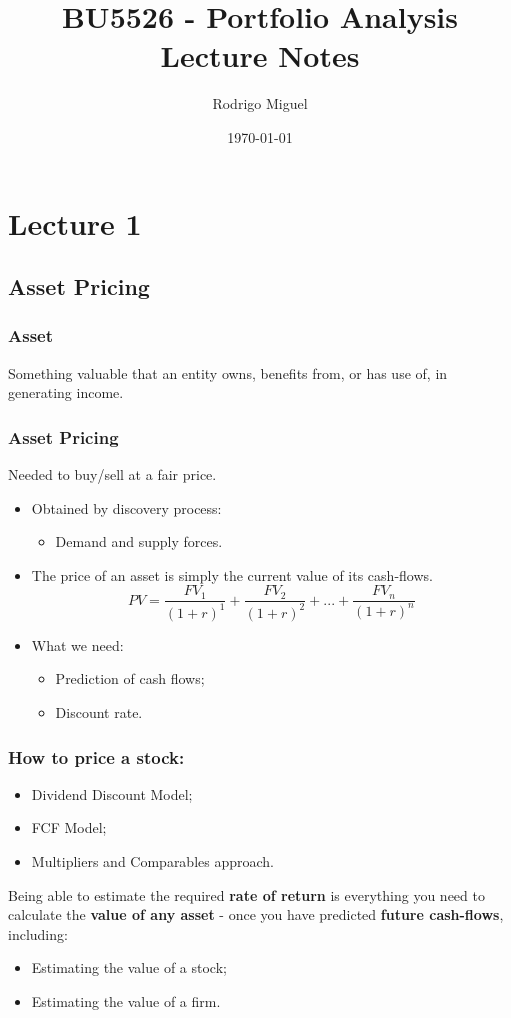 \documentclass[11pt,a4paper]{report}
\title{BU5526 - Portfolio Analysis \\ Lecture Notes}
\author{Rodrigo Miguel}
\date{\today}
\begin{document}
\maketitle
\tableofcontents

\chapter{Lecture 1}
\section{Asset Pricing}
\subsection{Asset}
Something valuable that an entity owns, benefits from, or has use of, in generating income.
\subsection{Asset Pricing}
Needed to buy/sell at a fair price.
\begin{itemize}
    \item Obtained by discovery process:
        \begin{itemize}
            \item Demand and supply forces.
        \end{itemize}
    \item The price of an asset is simply the current value of its cash-flows.
    \[ PV = \frac{FV_1}{(1+r)^1} + \frac{FV_2}{(1+r)^2}+ ... + \frac{FV_n}{(1+r)^n} \]
        \item What we need:
        \begin{itemize}
            \item Prediction of cash flows;
            \item Discount rate.
        \end{itemize}
\end{itemize}

\subsection{How to price a stock:}
\begin{itemize}
    \item Dividend Discount Model;
    \item FCF Model;
    \item Multipliers and Comparables approach.
\end{itemize}
Being able to estimate the required \textbf{rate of return} is everything you need to calculate the \textbf{value of any asset} - once you have predicted \textbf{future cash-flows}, including:
\begin{itemize}
    \item Estimating the value of a stock;
    \item Estimating the value of a firm.
\end{itemize}
\end{document}
